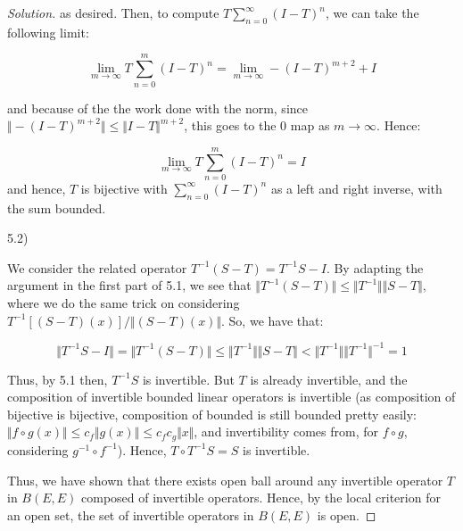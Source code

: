 \documentclass[10pt]{article}
\begin{document}
\begin{proof}[Solution]
as desired. Then, to compute $T \sum_{n=0}^\infty (I - T)^n$, we can take the following limit:

$$ \lim_{m \to \infty} T \sum_{n=0}^m (I - T)^n = \lim_{m \to \infty} -(I - T)^{m+2} + I $$

and because of the the work done with the norm, since $\Vert - (I - T)^{m+2} \Vert \leq \Vert I - T\Vert^{m+2}$, this goes to the 0 map as $m \to \infty$. Hence:

$$\lim_{m \to \infty} T \sum_{n=0}^m (I - T)^n = I$$ and hence, $T$ is bijective with $\sum_{n=0}^\infty (I - T)^n$ as a left and right inverse, with the sum bounded.

5.2)

We consider the related operator $T^{-1}(S - T) = T^{-1}S - I$. By adapting the argument in the first part of 5.1, we see that $\Vert T^{-1}(S- T)\Vert \leq \Vert T^{-1} \Vert \Vert S - T \Vert$, where we do the same trick on considering $T^{-1}[ (S-T)(x)]/\Vert (S-T)(x) \Vert$. So, we have that:

$$ \Vert T^{-1}S - I \Vert  = \Vert T^{-1}(S - T) \Vert \leq \Vert T^{-1} \Vert \Vert S - T \Vert < \Vert T^{-1} \Vert \Vert T^{-1} \Vert^{-1} = 1 $$

Thus, by 5.1 then, $T^{-1}S$ is invertible. But $T$ is already invertible, and the composition of invertible bounded linear operators is invertible (as composition of bijective is bijective, composition of bounded is still bounded pretty easily: $\Vert f \circ g (x)\Vert \leq c_f \Vert g(x) \Vert \leq c_f c_g \Vert x \Vert$, and invertibility comes from, for $f \circ g$, considering $g^{-1} \circ f^{-1}$). Hence, $T \circ T^{-1}S = S$ is invertible.

Thus, we have shown that there exists open ball around any invertible operator $T$ in $B(E,E)$ composed of invertible operators. Hence, by the local criterion for an open set, the set of invertible operators in $B(E,E)$ is open.

\end{proof}
\end{document}
